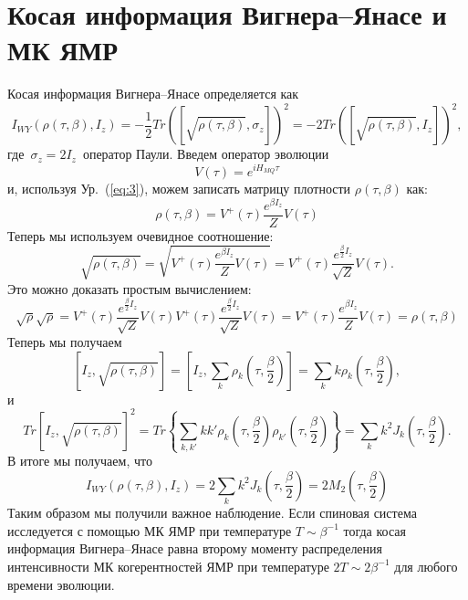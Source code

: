 \documentclass[preprint,12pt]{elsarticle}
\begin{document}
\section{Косая информация Вигнера--Янасе и МК ЯМР}
\label{sec:3}
Косая информация Вигнера--Янасе определяется как~\cite{1,2,3,4} 
\begin{equation}
    \label{eq:14}
        I_{WY}(\rho(\tau,\beta),I_z) = -\frac{1}{2}
            Tr([\sqrt{\rho(\tau,\beta)},\sigma_z])^2 =
                -2Tr([\sqrt{\rho(\tau,\beta)},I_z])^2,
\end{equation}
где~$\sigma_z=2I_z$~оператор Паули. 
Введем оператор эволюции
\begin{equation}
    \label{eq:15}
        V(\tau) = e^{iH_{MQ}\tau}
\end{equation}
и, используя Ур.~(\ref{eq:3}), можем записать матрицу плотности $\rho(\tau,\beta)$ как:
\begin{equation}
    \label{eq:16}
        \rho(\tau,\beta) = V^+(\tau) \frac{e^{\beta I_z}}{Z}V(\tau)
\end{equation}
Теперь мы используем очевидное соотношение:
\begin{equation}
    \label{eq:17}
        \sqrt{\rho(\tau,\beta)} =
            \sqrt{V^+(\tau)\frac{e^{\beta I_z}}{Z}V(\tau)} =
                V^+(\tau) \frac{e^{\frac{\beta}{2}I_z}}{\sqrt{Z}}V(\tau).
\end{equation}
Это можно доказать простым вычислением:
\begin{equation}
    \label{eq:18}
        \sqrt{\rho}\sqrt{\rho} =
						V^+(\tau)\frac{e^{\frac{\beta}{2}I_z}}{\sqrt{Z}}
                V(\tau)V^+(\tau)\frac{e^{\frac{\beta}{2}I_z}}{\sqrt{Z}}V(\tau) =
						V^+(\tau)\frac{e^{\beta I_z}}{Z}V(\tau) =
        \rho(\tau,\beta)
\end{equation}
%
Теперь мы получаем
%
\begin{equation} \label{eq:19}
    \left[I_z,\sqrt{\rho(\tau,\beta)}\right]
    = \left[I_z, \sum_k \rho_k \left(\tau, \frac{\beta}{2}\right)\right]
    = \sum_k k\rho_k \left(\tau, \frac{\beta}{2}\right),
\end{equation}
%
и
%
\begin{equation} \label{eq:20}
	Tr\left[I_z,\sqrt{\rho(\tau,\beta)} \right]^2
	= Tr\left\{\sum_{k,k'}kk'
		\rho_k\left(\tau,\frac{\beta}{2}\right)
		\rho_{k'}\left(\tau,\frac{\beta}{2}\right)
	\right\}
	= \sum_k k^2 J_k\left(\tau,\frac{\beta}{2}\right).
\end{equation}
%
В итоге мы получаем, что
%
\begin{equation} \label{eq:21}
    I_{WY}\left(\rho(\tau, \beta), I_z\right)
    = 2\sum_k k^2 J_k\left(\tau, \frac{\beta}{2}\right)
    = 2M_2\left(\tau, \frac{\beta}{2}\right)
\end{equation}
%
Таким образом мы получили важное наблюдение.
Если спиновая система исследуется с помощью МК ЯМР при температуре $T\sim\beta^{-1}$
тогда косая информация Вигнера--Янасе равна второму моменту распределения интенсивности МК когерентностей ЯМР при температуре $2T \sim 2\beta^{-1}$ для любого времени эволюции. 
\end{document}
